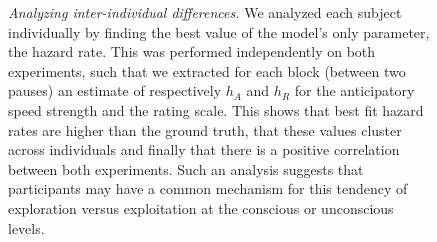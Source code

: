 \documentclass[12pt,english]{article}%
\newcommand{\seeFig}[1]{Figure~\ref{fig:#1}}
\begin{document}
\begin{figure}%
\caption{\emph{Analyzing inter-individual differences.} %
We analyzed each subject individually by finding 
the best value of the model's only parameter, the hazard rate.
This was performed independently on both experiments, 
such that we extracted for each block (between two pauses) 
an estimate of respectively $h_A$ and $h_R$ 
for the anticipatory speed strength and the rating scale.
This shows that best fit hazard rates are higher than the ground truth, 
that these values cluster across individuals 
and finally that there is a positive correlation between both experiments.
Such an analysis suggests that participants may have 
a common mechanism for this tendency of exploration versus exploitation 
at the conscious or unconscious levels.
}
\label{fig:results_inter}
\end{figure}
\end{document}
